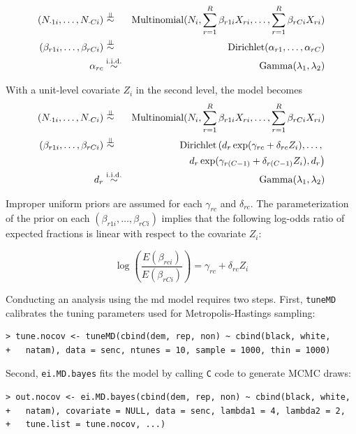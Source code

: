 \documentclass[12pt]{article}
\newcommand{\indep}{{\;\bot\!\!\!\!\!\!\bot\;}}
\begin{document}
\begin{eqnarray*}
(N_{\cdot 1i}, \dots, N_{\cdot Ci}) &\stackrel{\indep}{\sim}& {\rm
Multinomial}(N_i, \sum_{r=1}^R \beta_{r1i}X_{ri}, \dots, \sum_{r=1}^R \beta_{rCi}X_{ri}) \\
(\beta_{r1i}, \dots, \beta_{rCi}) &\stackrel{\indep}{\sim}& {\rm Dirichlet}(\alpha_{r1}, \dots, \alpha_{rC})\\
\alpha_{rc} &\stackrel{\rm i.i.d.}{\sim}& {\rm Gamma}(\lambda_1,\lambda_2) 
\end{eqnarray*}

With a unit-level covariate $Z_i$ in the second level, the model becomes
\begin{eqnarray*}
(N_{\cdot 1i}, \dots, N_{\cdot Ci}) &\stackrel{\indep}{\sim}& {\rm
Multinomial}(N_i, \sum_{r=1}^R \beta_{r1i}X_{ri}, \dots, \sum_{r=1}^R \beta_{rCi}X_{ri}) \\
(\beta_{r1i}, \dots, \beta_{rCi}) &\stackrel{\indep}{\sim}& {\rm
Dirichlet}\left(d_r\exp(\gamma_{rc} + \delta_{rc}Z_i), \dots, \right. \\
& & \quad\quad \left. d_r\exp(\gamma_{r(C-1)} +
\delta_{r(C-1)}Z_i), d_r \right) \\
d_r &\stackrel{\rm i.i.d.}{\sim}& {\rm Gamma}(\lambda_1, \lambda_2)  
\end{eqnarray*}

Improper uniform priors are assumed for each $\gamma_{rc}$ and
$\delta_{rc}$. The parameterization of the prior on each $(\beta_{r1i}, \dots,
\beta_{rCi})$ implies that the following log-odds ratio of expected
fractions is linear with respect to the covariate $Z_i$:

\begin{displaymath}
\log\left( \frac{E(\beta_{rci})}{E(\beta_{rCi})} \right) = \gamma_{rc}
+ \delta_{rc} Z_i
\end{displaymath}

Conducting an analysis using the {\sc md} model requires two steps.  First,
\texttt{tuneMD} calibrates the tuning parameters used for
Metropolis-Hastings sampling: 

\begin{verbatim}
> tune.nocov <- tuneMD(cbind(dem, rep, non) ~ cbind(black, white, 
+   natam), data = senc, ntunes = 10, sample = 1000, thin = 1000)
\end{verbatim}

\noindent Second, \texttt{ei.MD.bayes} fits the model by calling
\texttt{C} code to generate MCMC draws:

\begin{verbatim}
> out.nocov <- ei.MD.bayes(cbind(dem, rep, non) ~ cbind(black, white,
+   natam), covariate = NULL, data = senc, lambda1 = 4, lambda2 = 2,
+   tune.list = tune.nocov, ...)
\end{verbatim}
\end{document}
